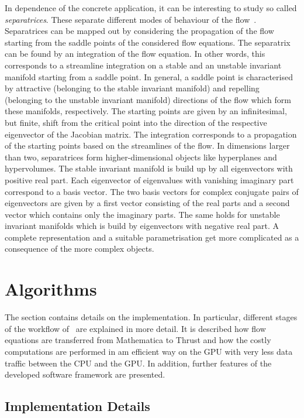 \documentclass[paper=a4,11pt,bibliography=totoc]{scrartcl}
\begin{document}
In dependence of the concrete application, it can be interesting to study so called \textit{separatrices}. These separate different modes of behaviour of the flow~\cite{Sadlo2017}. Separatrices can be mapped out by considering the propagation of the flow starting from the saddle points of the considered flow equations. The separatrix can be found by an integration of the flow equation. In other words, this corresponds to a streamline integration on a stable and an unstable invariant manifold starting from a saddle point. In general, a saddle point is characterised by attractive (belonging to the stable invariant manifold) and repelling (belonging to the unstable invariant manifold) directions of the flow which form these manifolds, respectively. The starting points are given by an infinitesimal, but finite, shift from the critical point into the direction of the respective eigenvector of the Jacobian matrix. The integration corresponds to a propagation of the starting points based on the streamlines of the flow. In dimensions larger than two, separatrices form higher-dimensional objects like hyperplanes and hypervolumes. The stable invariant manifold is build up by all eigenvectors with positive real part. Each eigenvector of eigenvalues with vanishing imaginary part correspond to a basis vector. The two basis vectors for complex conjugate pairs of eigenvectors are given by a first vector consisting of the real parts and a second vector which contains only the imaginary parts. The same holds for unstable invariant manifolds which is build by eigenvectors with negative real part. A complete representation and a suitable parametrisation get more complicated as a consequence of the more complex objects.

\section{Algorithms}
\label{sec:algorithms}

The section contains details on the implementation. In particular, different stages of the workflow of~ are explained in more detail. It is described how flow equations are transferred from Mathematica to Thrust and how the costly computations are performed in am efficient way on the GPU with very less data traffic between the CPU and the GPU. In addition, further features of the developed software framework are presented.

\subsection{Implementation Details}
\end{document}
